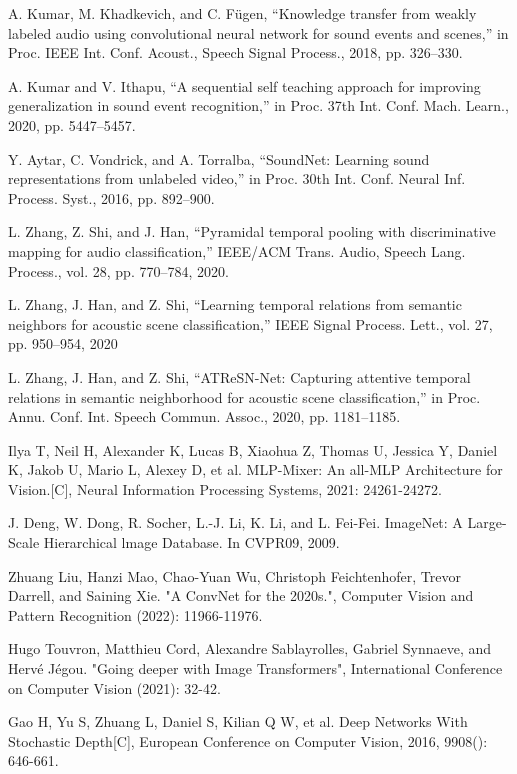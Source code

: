 \documentclass[runningheads]{llncs}
\begin{document}
\begin{thebibliography}{8}
\bibitem{}A. Kumar, M. Khadkevich, and C. Fügen, “Knowledge transfer from weakly labeled audio using convolutional neural network for sound events and scenes,” in Proc. IEEE Int. Conf. Acoust., Speech Signal Process., 2018, pp. 326–330.

\bibitem{}A. Kumar and V. Ithapu, “A sequential self teaching approach for improving generalization in sound event recognition,” in Proc. 37th Int. Conf. Mach. Learn., 2020, pp. 5447–5457.

\bibitem{}Y. Aytar, C. Vondrick, and A. Torralba, “SoundNet: Learning sound representations from unlabeled video,” in Proc. 30th Int. Conf. Neural Inf. Process. Syst., 2016, pp. 892–900.

\bibitem{}L. Zhang, Z. Shi, and J. Han, “Pyramidal temporal pooling with discriminative mapping for audio classification,” IEEE/ACM Trans. Audio, Speech Lang. Process., vol. 28, pp. 770–784, 2020.

\bibitem{}L. Zhang, J. Han, and Z. Shi, “Learning temporal relations from semantic neighbors for acoustic scene classification,” IEEE Signal Process. Lett., vol. 27, pp. 950–954, 2020

\bibitem{}L. Zhang, J. Han, and Z. Shi, “ATReSN-Net: Capturing attentive temporal relations in semantic neighborhood for acoustic scene classification,” in Proc. Annu. Conf. Int. Speech Commun. Assoc., 2020, pp. 1181–1185.

\bibitem{}Ilya T, Neil H, Alexander K, Lucas B, Xiaohua Z, Thomas U, Jessica Y, Daniel K, Jakob U, Mario L, Alexey D, et al. MLP-Mixer: An all-MLP Architecture for Vision.[C], Neural Information Processing Systems, 2021: 24261-24272.

\bibitem{}J. Deng, W. Dong, R. Socher, L.-J. Li, K. Li, and L. Fei-Fei. ImageNet: A Large-Scale Hierarchical lmage Database. In CVPR09, 2009.

\bibitem{} Zhuang Liu, Hanzi Mao, Chao-Yuan Wu, Christoph Feichtenhofer, Trevor Darrell, and Saining Xie. "A ConvNet for the 2020s.", Computer Vision and Pattern Recognition (2022): 11966-11976.

\bibitem{} Hugo Touvron, Matthieu Cord, Alexandre Sablayrolles, Gabriel Synnaeve, and Hervé Jégou. "Going deeper with Image Transformers", International Conference on Computer Vision (2021): 32-42.

\bibitem{} Gao H, Yu S, Zhuang L, Daniel S, Kilian Q W, et al. Deep Networks With Stochastic Depth[C], European Conference on Computer Vision, 2016, 9908(): 646-661.


\end{thebibliography}
\end{document}
